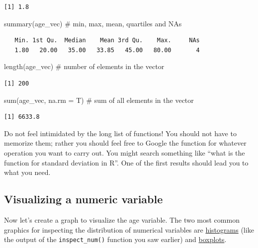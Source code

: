 \documentclass[
  letterpaper,
  DIV=11,
  numbers=noendperiod]{scrreprt}
\newenvironment{Shaded}{\begin{snugshade}}{\end{snugshade}}
\newcommand{\AttributeTok}[1]{\textcolor[rgb]{0.40,0.45,0.13}{#1}}
\newcommand{\CommentTok}[1]{\textcolor[rgb]{0.37,0.37,0.37}{#1}}
\newcommand{\FunctionTok}[1]{\textcolor[rgb]{0.28,0.35,0.67}{#1}}
\newcommand{\NormalTok}[1]{\textcolor[rgb]{0.00,0.23,0.31}{#1}}
\begin{document}
\begin{verbatim}
[1] 1.8
\end{verbatim}

\begin{Shaded}
\begin{Highlighting}[]
\FunctionTok{summary}\NormalTok{(age\_vec) }\CommentTok{\# min, max, mean, quartiles and NAs}
\end{Highlighting}
\end{Shaded}

\begin{verbatim}
   Min. 1st Qu.  Median    Mean 3rd Qu.    Max.     NAs 
   1.80   20.00   35.00   33.85   45.00   80.00       4 
\end{verbatim}

\begin{Shaded}
\begin{Highlighting}[]
\FunctionTok{length}\NormalTok{(age\_vec) }\CommentTok{\# number of elements in the vector}
\end{Highlighting}
\end{Shaded}

\begin{verbatim}
[1] 200
\end{verbatim}

\begin{Shaded}
\begin{Highlighting}[]
\FunctionTok{sum}\NormalTok{(age\_vec, }\AttributeTok{na.rm =}\NormalTok{ T) }\CommentTok{\# sum of all elements in the vector}
\end{Highlighting}
\end{Shaded}

\begin{verbatim}
[1] 6633.8
\end{verbatim}

Do not feel intimidated by the long list of functions! You should not
have to memorize them; rather you should feel free to Google the
function for whatever operation you want to carry out. You might search
something like ``what is the function for standard deviation in R''. One
of the first results should lead you to what you need.

\subsection{Visualizing a numeric
variable}\label{visualizing-a-numeric-variable}

Now let's create a graph to visualize the age variable. The two most
common graphics for inspecting the distribution of numerical variables
are \href{https://www.mathsisfun.com/data/histograms.html}{histograms}
(like the output of the \texttt{inspect\_num()} function you saw
earlier) and
\href{https://www.mathsisfun.com/data/quartiles.html}{boxplots}.
\end{document}
